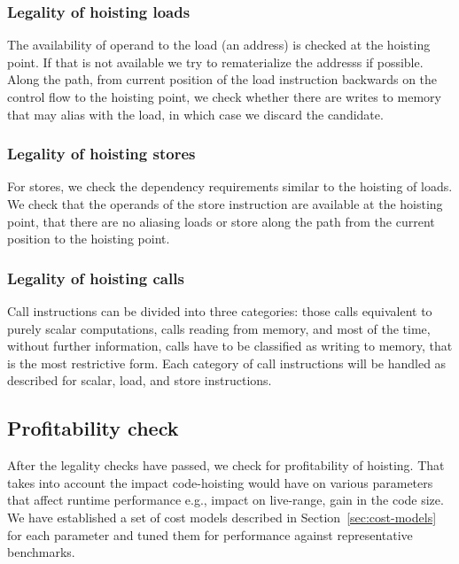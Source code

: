 \documentclass{sig-alternate}
\begin{document}
\subsubsection{Legality of hoisting loads}
The availability of operand to the load (an address) is checked at the hoisting
point. If that is not available we try to rematerialize the addresss if
possible.  Along the path, from current position of the load instruction
backwards on the control flow to the hoisting point, we check whether there are
writes to memory that may alias with the load, in which case we discard the
candidate.

\subsubsection{Legality of hoisting stores}
For stores, we check the dependency requirements similar to the hoisting of
loads. We check that the operands of the store instruction are available at the
hoisting point, that there are no aliasing loads or store along the path from
the current position to the hoisting point.

\subsubsection{Legality of hoisting calls}
Call instructions can be divided into three categories: those calls equivalent
to purely scalar computations, calls reading from memory, and most of the time,
without further information, calls have to be classified as writing to memory,
that is the most restrictive form.  Each category of call instructions will be
handled as described for scalar, load, and store instructions.

\subsection{Profitability check}
\label{subsec:profitability}
After the legality checks have passed, we check for profitability of hoisting.
That takes into account the impact code-hoisting would have on various
parameters that affect runtime performance e.g., impact on live-range, gain in
the code size.  We have established a set of cost models described in Section~\ref{sec:cost-models}
for each parameter and tuned them for performance against representative
benchmarks.
\end{document}
